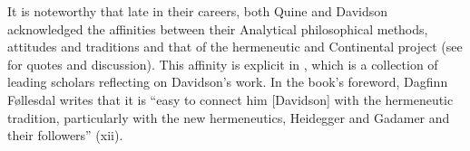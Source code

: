 It is noteworthy that late in their careers, both Quine and Davidson acknowledged the affinities between their Analytical philosophical methods, attitudes and traditions and that of the hermeneutic and Continental project (see \citealt{Slezak2018} for quotes and discussion). This affinity is explicit in \citet{Malpas2011}, which is a collection of leading scholars reflecting on Davidson’s work. In the book’s foreword, Dagfinn Føllesdal writes that it is “easy to connect him [Davidson] with the hermeneutic tradition, particularly with the new hermeneutics, Heidegger and Gadamer and their followers” (xii).
